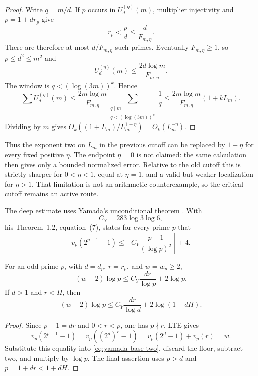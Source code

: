 \begin{proof}
Write $q=m/d$.  If $p$ occurs in $U_d^{(\eta)}(m)$, multiplier
injectivity and $p=1+d r_p$ give
\[
 r_p<\frac p d\le\frac d{F_{m,\eta}}.
\]
There are therefore at most $d/F_{m,\eta}$ such primes.  Eventually
$F_{m,\eta}\ge1$, so $p\le d^2\le m^2$ and
\[
 U_d^{(\eta)}(m)\le\frac{2d\log m}{F_{m,\eta}}.
\]
The window is $q<(\log(3m))^k$.  Hence
\[
 \sum U_d^{(\eta)}(m)
 \le\frac{2m\log m}{F_{m,\eta}}
    \sum_{\substack{q\mid m\\q<(\log(3m))^k}}\frac1q
 \le\frac{2m\log m}{F_{m,\eta}}(1+kL_m).
\]
Dividing by $m$ gives
$O_k((1+L_m)/L_m^{1+\eta})=O_k(L_m^{-\eta})$.
\end{proof}

Thus the exponent two on $L_m$ in the previous cutoff can be replaced by
$1+\eta$ for every fixed positive $\eta$.  The endpoint $\eta=0$ is not
claimed: the same calculation then gives only a bounded normalized error.
Relative to the old cutoff this is strictly sharper for $0<\eta<1$, equal at
$\eta=1$, and a valid but weaker localization for $\eta>1$.
That limitation is not an arithmetic counterexample, so the critical cutoff
remains an active route.

The deep estimate uses Yamada's unconditional theorem
\cite{Yamada2010}.  With
\[
                       C_Y=283\log3\log6,
\]
his Theorem~1.2, equation~(7), states for every prime $p$ that
\begin{equation}\label{eq:yamada-base-two}
 v_p(2^{p-1}-1)
 \le\left\lfloor C_Y\frac{p-1}{(\log p)^2}\right\rfloor+4.
\end{equation}

\begin{lemma}
\label{lem:exact-order-yamada-envelope}
For an odd prime $p$, with $d=d_p$, $r=r_p$, and $w=w_p\ge2$,
\[
 (w-2)\log p\le C_Y\frac{dr}{\log p}+2\log p.
\]
If $d>1$ and $r<H$, then
\begin{equation}\label{eq:yamada-multiplier-envelope}
 (w-2)\log p
 \le C_Y\frac{dr}{\log d}+2\log(1+dH).
\end{equation}
\end{lemma}

\begin{proof}
Since $p-1=dr$ and $0<r<p$, one has $p\nmid r$.  LTE gives
\[
 v_p(2^{p-1}-1)=v_p((2^d)^r-1)
 =v_p(2^d-1)+v_p(r)=w.
\]
Substitute this equality into \eqref{eq:yamada-base-two}, discard the floor,
subtract two, and multiply by $\log p$.  The final assertion uses
$p>d$ and $p=1+dr<1+dH$.
\end{proof}

